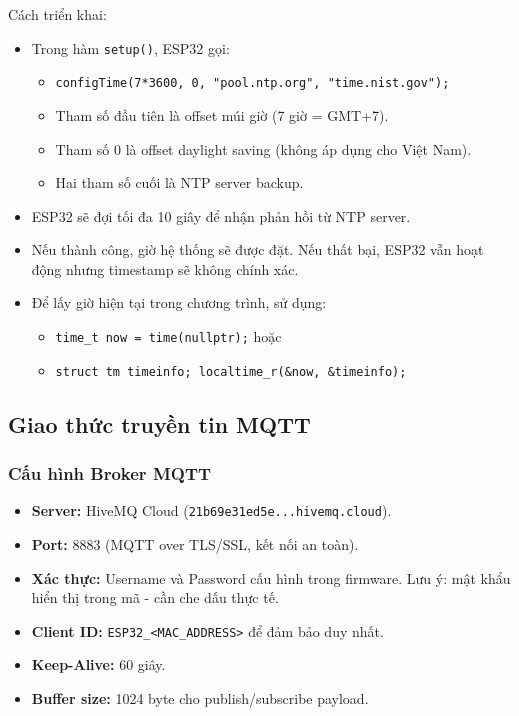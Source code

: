 \documentclass[../BTL_PTIT.tex]{subfiles}
\begin{document}
Cách triển khai:
\begin{itemize}[label=\textbullet]
    \item Trong hàm \texttt{setup()}, ESP32 gọi:
    \begin{itemize}[label=--]
        \item \texttt{configTime(7*3600, 0, "pool.ntp.org", "time.nist.gov");}
        \item Tham số đầu tiên là offset múi giờ (7 giờ = GMT+7).
        \item Tham số 0 là offset daylight saving (không áp dụng cho Việt Nam).
        \item Hai tham số cuối là NTP server backup.
    \end{itemize}
    \item ESP32 sẽ đợi tối đa 10 giây để nhận phản hồi từ NTP server.
    \item Nếu thành công, giờ hệ thống sẽ được đặt. Nếu thất bại, ESP32 vẫn hoạt động nhưng timestamp sẽ không chính xác.
    \item Để lấy giờ hiện tại trong chương trình, sử dụng:
    \begin{itemize}[label=--]
        \item \texttt{time\_t now = time(nullptr);} hoặc
        \item \texttt{struct tm timeinfo; localtime\_r(\&now, \&timeinfo);}
    \end{itemize}
\end{itemize}

\subsection{Giao thức truyền tin MQTT}

\subsubsection{Cấu hình Broker MQTT}
\begin{itemize}[label=\textbullet]
    \item \textbf{Server:} HiveMQ Cloud (\texttt{21b69e31ed5e...hivemq.cloud}).
    \item \textbf{Port:} 8883 (MQTT over TLS/SSL, kết nối an toàn).
    \item \textbf{Xác thực:} Username và Password cấu hình trong firmware. Lưu ý: mật khẩu hiển thị trong mã - cần che dấu thực tế.
    \item \textbf{Client ID:} \texttt{ESP32\_<MAC\_ADDRESS>} để đảm bảo duy nhất.
    \item \textbf{Keep-Alive:} 60 giây.
    \item \textbf{Buffer size:} 1024 byte cho publish/subscribe payload.
\end{itemize}
\end{document}
